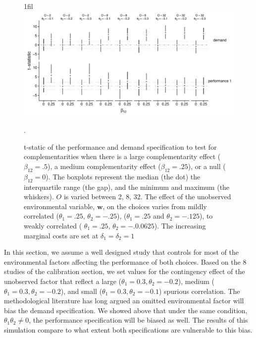 \documentclass[12pt]{article}
\makeatletter
\newcommand*{\centerfloat}{%
  \parindent \z@
  \leftskip \z@ \@plus 1fil \@minus \textwidth
  \rightskip\leftskip
  \parfillskip \z@skip}
\makeatother
\begin{document}
\begin{figure}
\centerfloat
\includegraphics[width=550px]{figure-latex/spurious_plot.pdf}
\caption[Error Rate and Power with Unobserved Environmental Variables]
{\label{spurious} t-static of the performance and demand specification to test
for complementarities when there is a large complementarity effect
($\beta_{12} = .5$), a medium complementarity effect ($\beta_{12} = .25$),
or a null ($\beta_{12} = 0$). The boxplots represent the median (the dot) the
interquartile range (the gap), and the minimum and maximum (the whiskers). $O$
is varied between 2, 8, 32. The effect of the unobserved environmental variable,
$\mathbf{w}$, on the choices varies from mildly correlated ($\theta_1 = .25$,
$\theta_2 = -.25$), ($\theta_1 = .25$ and $\theta_2 = -.125$),
to weakly correlated ( $\theta_1 =.25$, $\theta_2 = -.0.0625$). The increasing
marginal costs are set at $\delta_1 = \delta_2 = 1$}.
\end{figure}



In this section, we assume a well designed study that controls for most of the environmental factors affecting the performance of both choices. Based on the 8 studies of the calibration section, we set values for the contingency effect of the unobserved factor that reflect a large ($\theta_1 = 0.3, \theta_2 = -0.2$), medium ($\theta_1 = 0.3, \theta_2 = -0.2$), and small ($\theta_1 = 0.3, \theta_2 = -0.1$) spurious correlation. The methodological literature has long argued an omitted environmental factor will bias the demand specification. We showed above that under the same condition, $\theta_1 \theta_2 \neq 0$, the performance specification will be biased as well. The results of this simulation compare to what extent both specifications are vulnerable to this bias.
\end{document}
